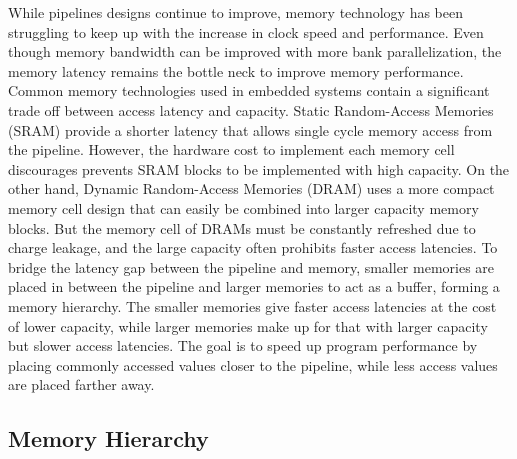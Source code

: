 While pipelines designs continue to improve, memory technology has been struggling to keep up with the increase in clock speed and performance.
Even though memory bandwidth can be improved with more bank parallelization, the memory latency remains the bottle neck to improve memory performance.
Common memory technologies used in embedded systems contain a significant trade off between access latency and capacity. 
Static Random-Access Memories (SRAM) provide a shorter latency that allows single cycle memory access from the pipeline.
However, the hardware cost to implement each memory cell discourages prevents SRAM blocks to be implemented with high capacity.
On the other hand, Dynamic Random-Access Memories (DRAM) uses a more compact memory cell design that can easily be combined into larger capacity memory blocks.
But the memory cell of DRAMs must be constantly refreshed due to charge leakage, and the large capacity often prohibits faster access latencies.
To bridge the latency gap between the pipeline and memory, smaller memories are placed in between the pipeline and larger memories to act as a buffer, forming a memory hierarchy.
The smaller memories give faster access latencies at the cost of lower capacity, while larger memories make up for that with larger capacity but slower access latencies. 
The goal is to speed up program performance by placing commonly accessed values closer to the pipeline, while less access values are placed farther away.

\subsection{Memory Hierarchy}
